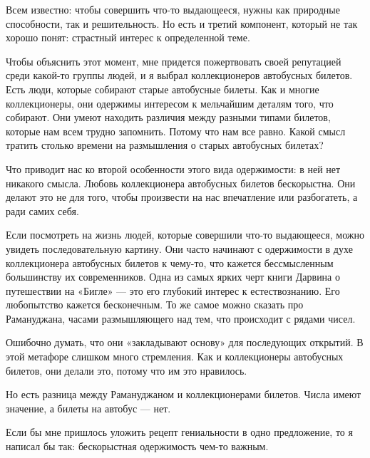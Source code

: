 \documentclass[ebook,12pt,oneside,openany]{memoir}
\date{}
\begin{document}
\maketitle

Всем известно: чтобы совершить что-то выдающееся, нужны как природные
способности, так и решительность. Но есть и третий компонент, который
не так хорошо понят: страстный интерес к определенной теме. \newline

Чтобы объяснить этот момент, мне придется пожертвовать своей
репутацией среди какой-то группы людей, и я выбрал коллекционеров
автобусных билетов. Есть люди, которые собирают старые автобусные
билеты. Как и многие коллекционеры, они одержимы интересом к
мельчайшим деталям того, что собирают. Они умеют находить различия
между разными типами билетов, которые нам всем трудно запомнить.
Потому что нам все равно. Какой смысл тратить столько времени на
размышления о старых автобусных билетах? \newline

Что приводит нас ко второй особенности этого вида одержимости: в ней
нет никакого смысла. Любовь коллекционера автобусных билетов
бескорыстна. Они делают это не для того, чтобы произвести на нас
впечатление или разбогатеть, а ради самих себя. \newline

Если посмотреть на жизнь людей, которые совершили что-то выдающееся,
можно увидеть последовательную картину. Они часто начинают с
одержимости в духе коллекционера автобусных билетов к чему-то, что
кажется бессмысленным большинству их современников. Одна из самых
ярких черт книги Дарвина о путешествии на «Бигле» — это его глубокий
интерес к естествознанию. Его любопытство кажется бесконечным. То же
самое можно сказать про Рамануджана, часами размышляющего над тем, что
происходит с рядами чисел. \newline

Ошибочно думать, что они «закладывают основу» для последующих
открытий. В этой метафоре слишком много стремления. Как и
коллекционеры автобусных билетов, они делали это, потому что им это
нравилось. \newline

Но есть разница между Рамануджаном и коллекционерами билетов. Числа
имеют значение, а билеты на автобус — нет. \newline

Если бы мне пришлось уложить рецепт гениальности в одно предложение,
то я написал бы так: бескорыстная одержимость чем-то важным. \newline
\end{document}
